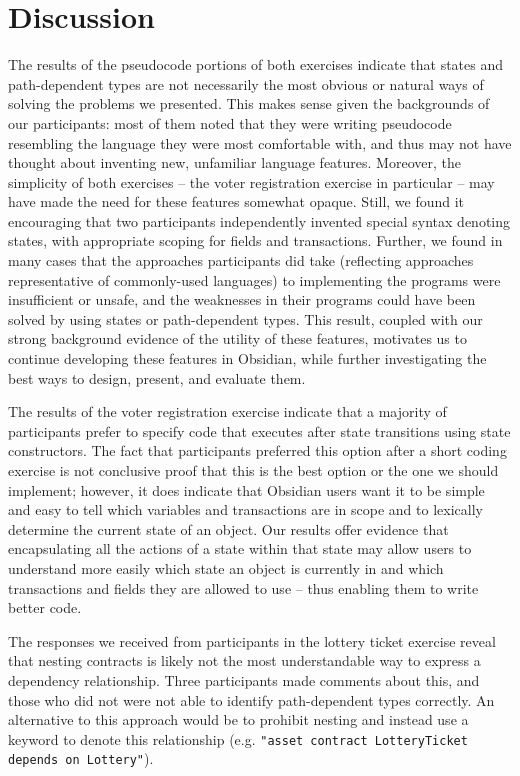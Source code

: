 \documentclass[sigplan,10pt,review]{acmart}\settopmatter{printfolios=true}
\begin{document}
\section{Discussion}

The results of the pseudocode portions of both exercises indicate that states and path-dependent types are not necessarily the most obvious or 
natural ways of solving the problems we presented. This makes sense given the backgrounds of our participants: most of them noted that they 
were writing pseudocode resembling the language they were most comfortable with, and thus may not have thought about inventing new, 
unfamiliar language features. Moreover, the simplicity of both exercises -- the voter registration exercise in particular -- may have made the 
need for these features somewhat opaque. Still, we found it encouraging that two participants independently invented special syntax denoting states, with appropriate scoping for fields and transactions. Further, we found in many cases that the approaches participants did take (reflecting approaches representative of commonly-used languages) to implementing the 
programs were insufficient or unsafe, and the weaknesses in their programs could have been solved by using states or path-dependent 
types. This result, coupled with our strong background evidence of the utility of these features, motivates us to continue developing these
features in Obsidian, while further investigating the best ways to design, present, and evaluate them. 

The results of the voter registration exercise indicate that a majority of participants prefer to specify code that executes after state transitions using state constructors. The 
fact that participants preferred this option after a short coding exercise is not conclusive proof that this is the best option or the one we should 
implement; however, it does indicate that Obsidian users want it to be simple and easy to tell which variables and transactions are in scope and to lexically determine the 
current state of an object. Our results offer evidence that encapsulating all the actions of a state within that state may allow users to understand 
more easily which state an object is currently in and which transactions and fields they are allowed to use -- thus enabling them to write better code. 

The responses we received from participants in the lottery ticket exercise reveal that nesting contracts is likely not the most understandable
way to express a dependency relationship. Three participants made comments about this, and those who did not were not 
able to identify path-dependent types correctly. An alternative to this approach would be to prohibit nesting and instead use a keyword
to denote this relationship (e.g. \texttt{\small{"asset contract LotteryTicket depends on Lottery"}}).
\end{document}
